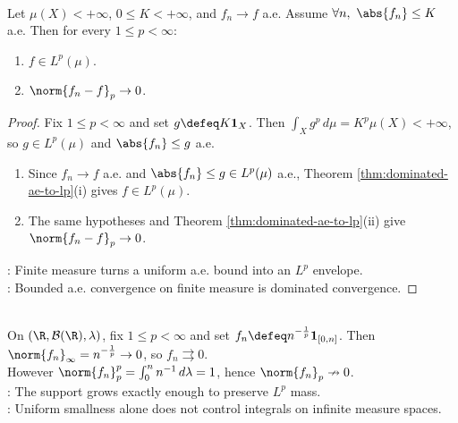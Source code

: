 \begin{corollary} \label{cor:bounded-ae-finite-measure-lp} \\
Let $\mu(X)<+\infty$, $0\leq K<+\infty$, and $f_n\to f$ a.e. Assume $\forall n,\ \abs{f_n}\leq K$ a.e. Then for every $1\leq p<\infty$:
\begin{enumerate}[label=(\roman*)]
\setlength{\itemsep}{0pt}
\item $f\in L^p(\mu)$.
\item $\norm{f_n-f}_p\to0$.
\end{enumerate}
\begin{proof}
Fix $1\leq p<\infty$ and set $g\defeq K\mathbf{1}_X$. Then $\int_Xg^p\,d\mu=K^p\mu(X)<+\infty$, so $g\in L^p(\mu)$ and $\abs{f_n}\leq g$ a.e.
\begin{enumerate}[label=(\roman*)]
\setlength{\itemsep}{0pt}
\item Since $f_n\to f$ a.e. and $\abs{f_n}\leq g\in L^p(\mu)$ a.e., Theorem \ref{thm:dominated-ae-to-lp}(i) gives $f\in L^p(\mu)$.
\item The same hypotheses and Theorem \ref{thm:dominated-ae-to-lp}(ii) give $\norm{f_n-f}_p\to0$.
\end{enumerate}
: Finite measure turns a uniform a.e. bound into an $L^p$ envelope.\\
: Bounded a.e. convergence on finite measure is dominated convergence.
\end{proof}
\end{corollary}

\begin{example} \label{ex:modes-uniform-not-lp-infinite-measure} \\
On $(\R,\mathcal{B}(\R),\lambda)$, fix $1\leq p<\infty$ and set $f_n\defeq n^{-\frac{1}{p}}\mathbf{1}_{[0,n]}$. Then $\norm{f_n}_\infty=n^{-\frac{1}{p}}\to0$, so $f_n\rightrightarrows0$.\\
However $\norm{f_n}_p^p=\int_0^n n^{-1}\,d\lambda=1$, hence $\norm{f_n}_p\nrightarrow0$.\\
: The support grows exactly enough to preserve $L^p$ mass.\\
: Uniform smallness alone does not control integrals on infinite measure spaces.
\end{example}

